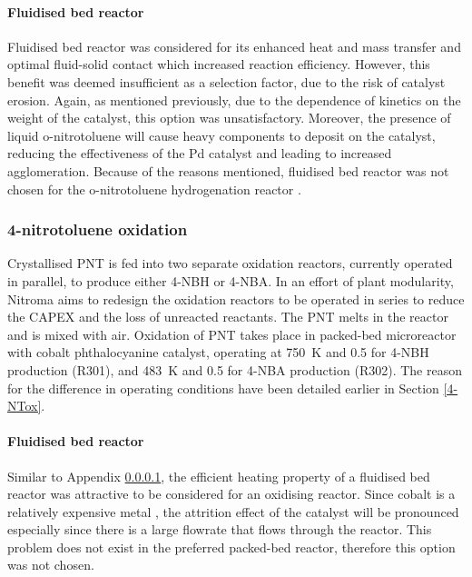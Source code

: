 \paragraph{Fluidised bed reactor}
\label{fbr}
Fluidised bed reactor was considered for its enhanced heat and mass transfer and optimal fluid-solid contact which increased reaction efficiency. However, this benefit was deemed insufficient as a selection factor, due to the risk of catalyst erosion. Again, as mentioned previously, due to the dependence of kinetics on the weight of the catalyst, this option was unsatisfactory. Moreover, the presence of liquid o-nitrotoluene will cause heavy components to deposit on the catalyst, reducing the effectiveness of the Pd catalyst and leading to increased agglomeration. Because of the reasons mentioned, fluidised bed reactor was not chosen for the o-nitrotoluene hydrogenation reactor \cite{farrell_kinetics_1979}.



\subsubsection{4-nitrotoluene oxidation}

Crystallised PNT is fed into two separate oxidation reactors, currently operated in parallel, to produce either 4-NBH or 4-NBA. In an effort of plant modularity, Nitroma aims to redesign the oxidation reactors to be operated in series to reduce the CAPEX and the loss of unreacted reactants. The PNT melts in the reactor and is mixed with air. Oxidation of PNT takes place in packed-bed microreactor with cobalt phthalocyanine catalyst, operating at \SI{750}{\K} and \SI{0.5}{\atm} for 4-NBH production (R301), and \SI{483}{\K} and \SI{0.5}{\atm} for 4-NBA production (R302). The reason for the difference in operating conditions have been detailed earlier in Section \ref{4-NTox}.

\paragraph{Fluidised bed reactor}
Similar to Appendix \ref{fbr}, the efficient heating property of a fluidised bed reactor was attractive to be considered for an oxidising reactor. Since cobalt is a relatively expensive metal \cite{saib_fundamental_2014}, the attrition effect of the catalyst will be pronounced especially since there is a large flowrate that flows through the reactor. This problem does not exist in the preferred packed-bed reactor, therefore this option was not chosen.

